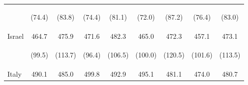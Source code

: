 \begin{center}
\begin{tabular}{lcccccccc}
 & \begin{footnotesize}(74.4)\end{footnotesize} & \begin{footnotesize}(83.8)\end{footnotesize} & \begin{footnotesize}(74.4)\end{footnotesize} & \begin{footnotesize}(81.1)\end{footnotesize} & \begin{footnotesize}(72.0)\end{footnotesize} & \begin{footnotesize}(87.2)\end{footnotesize} & \begin{footnotesize}(76.4)\end{footnotesize} & \begin{footnotesize}(83.0)\end{footnotesize}\\
\noalign{\smallskip}Israel & 464.7 & 475.9 & 471.6 & 482.3 & 465.0 & 472.3 & 457.1 & 473.1\\
 & \begin{footnotesize}(99.5)\end{footnotesize} & \begin{footnotesize}(113.7)\end{footnotesize} & \begin{footnotesize}(96.4)\end{footnotesize} & \begin{footnotesize}(106.5)\end{footnotesize} & \begin{footnotesize}(100.0)\end{footnotesize} & \begin{footnotesize}(120.5)\end{footnotesize} & \begin{footnotesize}(101.6)\end{footnotesize} & \begin{footnotesize}(113.5)\end{footnotesize}\\
\noalign{\smallskip}Italy & 490.1 & 485.0 & 499.8 & 492.9 & 495.1 & 481.1 & 474.0 & 480.7\\

\end{tabular}
\end{center}
